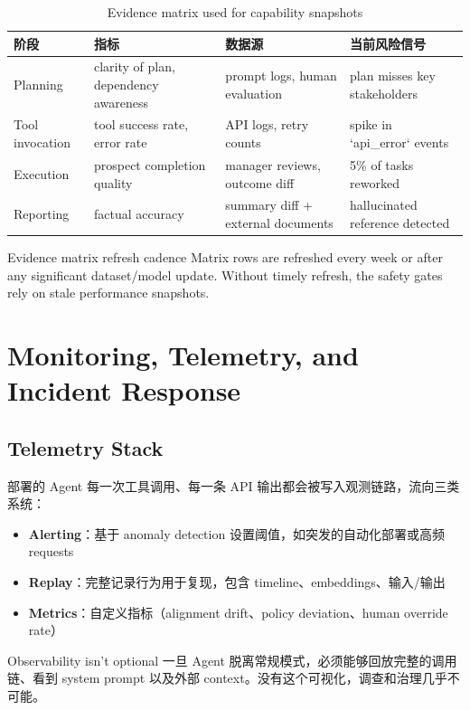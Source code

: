 \documentclass[a4paper]{article}
\begin{document}
\begin{table}[H]
\centering
\begin{tabular}{p{}p{}p{}p{}}
\toprule
阶段 & 指标 & 数据源 & 当前风险信号 \\
\midrule
Planning & clarity of plan, dependency awareness & prompt logs, human evaluation & plan misses key stakeholders \\
Tool invocation & tool success rate, error rate & API logs, retry counts & spike in `api\_error` events \\
Execution & prospect completion quality & manager reviews, outcome diff & 5\% of tasks reworked \\
Reporting & factual accuracy & summary diff + external documents & hallucinated reference detected \\
\bottomrule
\end{tabular}
\caption{Evidence matrix used for capability snapshots}
\end{table}

\begin{warningbox}{Evidence matrix refresh cadence}
Matrix rows are refreshed every week or after any significant dataset/model update. Without timely refresh, the safety gates rely on stale performance snapshots.
\end{warningbox}

\section{Monitoring, Telemetry, and Incident Response}

\subsection{Telemetry Stack}

部署的 Agent 每一次工具调用、每一条 API 输出都会被写入观测链路，流向三类系统：

\begin{itemize}
    \item \textbf{Alerting}：基于 anomaly detection 设置阈值，如突发的自动化部署或高频 requests
    \item \textbf{Replay}：完整记录行为用于复现，包含 timeline、embeddings、输入/输出
    \item \textbf{Metrics}：自定义指标（alignment drift、policy deviation、human override rate）
\end{itemize}

\begin{warningbox}{Observability isn't optional}
一旦 Agent 脱离常规模式，必须能够回放完整的调用链、看到 system prompt 以及外部 context。没有这个可视化，调查和治理几乎不可能。
\end{warningbox}
\end{document}
